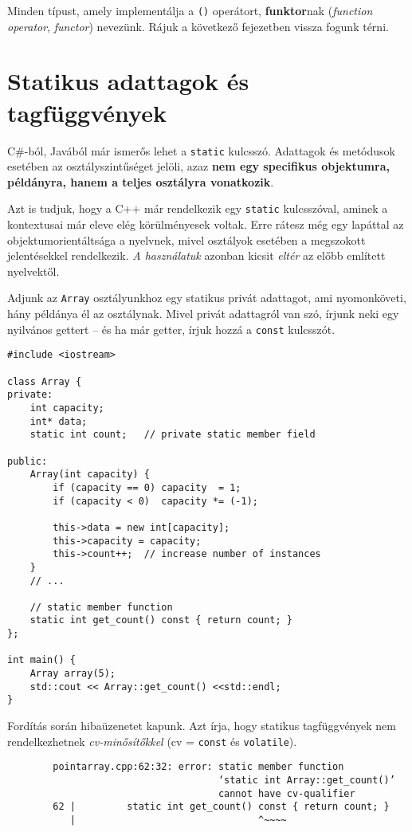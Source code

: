 \documentclass[a4paper, 11pt, oneside]{book}
\begin{document}
Minden típust, amely implementálja a \verb*|()| operátort, \textbf{funktor}nak (\textit{function operator}, \textit{functor}) nevezünk. Rájuk a következő fejezetben vissza fogunk térni.

\section{Statikus adattagok és tagfüggvények}

C\#-ból, Javából már ismerős lehet a \verb*|static| kulcsszó. Adattagok és metódusok esetében az osztályszintűséget jelöli, azaz \textbf{nem egy specifikus objektumra, példányra, hanem a teljes osztályra vonatkozik}.

Azt is tudjuk, hogy a C++ már rendelkezik egy \verb*|static| kulcsszóval, aminek a kontextusai már eleve elég körülményesek voltak. Erre rátesz még egy lapáttal az objektumorientáltsága a nyelvnek, mivel osztályok esetében a megszokott jelentésekkel rendelkezik. \textit{A használatuk} azonban kicsit \textit{eltér} az előbb említett nyelvektől.

Adjunk az \verb*|Array| osztályunkhoz egy statikus privát adattagot, ami nyomonköveti, hány példánya él az osztálynak. Mivel privát adattagról van szó, írjunk neki egy nyilvános gettert -- és ha már getter, írjuk hozzá a \verb*|const| kulcsszót.

\begin{lstlisting}[style=cppstyle]
#include <iostream>

class Array {
private:
	int capacity;
	int* data;
	static int count;	// private static member field

public: 
	Array(int capacity) {
		if (capacity == 0) capacity  = 1;
		if (capacity < 0)  capacity *= (-1);
		
		this->data = new int[capacity];
		this->capacity = capacity;
		this->count++; 	// increase number of instances
	}
	// ...
	
	// static member function
	static int get_count() const { return count; }
};

int main() {
	Array array(5);
	std::cout << Array::get_count() <<std::endl;
}
\end{lstlisting}

Fordítás során hibaüzenetet kapunk. Azt írja, hogy statikus tagfüggvények nem rendelkezhetnek \textit{cv-minősítőkkel} (cv = \verb*|const| és \verb*|volatile|).

\begin{framed}
	\begin{verbatim}
		pointarray.cpp:62:32: error: static member function 
		                             ‘static int Array::get_count()’ 
		                             cannot have cv-qualifier
		62 |         static int get_count() const { return count; }
		   |                                ^~~~~
	\end{verbatim}
\end{framed}
\end{document}
